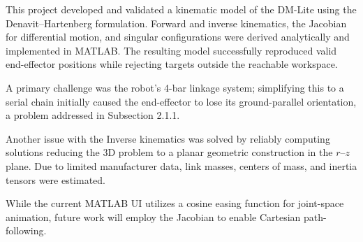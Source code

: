 \documentclass[12pt,a4paper]{article}
\begin{document}
This project developed and validated a kinematic model of the DM-Lite using the Denavit–Hartenberg formulation. 
Forward and inverse kinematics, the Jacobian for differential motion, and singular configurations were derived analytically and 
implemented in MATLAB. The resulting model successfully reproduced valid end-effector positions while rejecting targets outside the 
reachable workspace.

A primary challenge was the robot's 4-bar linkage system; simplifying this to a serial chain initially caused the 
end-effector to lose its ground-parallel orientation, a problem addressed in Subsection 2.1.1. 

Another issue with the Inverse kinematics was solved by reliably computing solutions 
reducing the 3D problem to a planar geometric construction in the $r$–$z$ plane. Due to limited manufacturer data, link masses, centers of 
mass, and inertia tensors were estimated. 

While the current MATLAB UI utilizes a cosine easing function for joint-space animation, future work 
will employ the Jacobian to enable Cartesian path-following.










\end{document}
